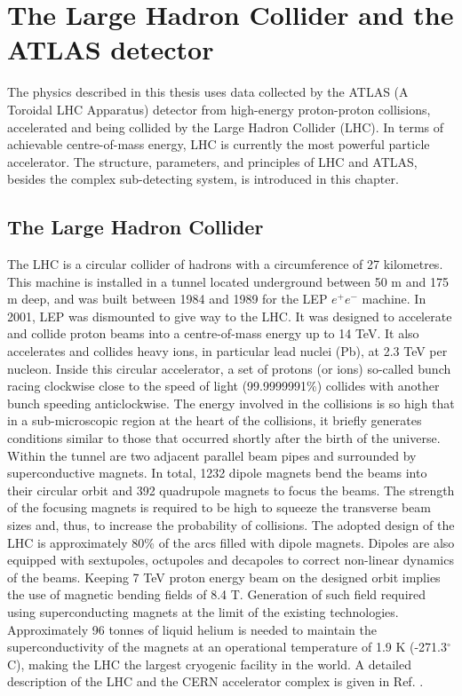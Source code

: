 \chapter{The Large Hadron Collider and the ATLAS detector}
\label{LHC&ATLAS}

The physics described in this thesis uses data collected by the ATLAS (A Toroidal LHC Apparatus) detector from high-energy proton-proton collisions, accelerated and being collided by the Large Hadron Collider (LHC). In terms of achievable centre-of-mass energy, LHC is currently the most powerful particle accelerator. The structure, parameters, and principles of LHC and ATLAS, besides the complex sub-detecting system, is introduced in this chapter.

\section{The Large Hadron Collider}
\label{chap2:LHC}
The LHC is a circular collider of hadrons with a circumference of 27 kilometres. This machine is installed in a tunnel located underground between 50 m and 175 m deep, and was built between 1984 and 1989 for the LEP $e^+e^-$ machine. In 2001, LEP was dismounted to give way to the LHC. It was designed to accelerate and collide proton beams into a centre-of-mass energy up to 14 TeV. It also accelerates and collides heavy ions, in particular lead nuclei (Pb), at 2.3 TeV per nucleon. Inside this circular accelerator, a set of protons (or ions) so-called bunch racing clockwise close to the speed of light (99.9999991\%) collides with another bunch speeding anticlockwise. The energy involved in the collisions is so high that in a sub-microscopic region at the heart of the collisions, it briefly generates conditions similar to those that occurred shortly after the birth of the universe. \\ 
Within the tunnel are two adjacent parallel beam pipes and surrounded by superconductive magnets. In total, 1232 dipole magnets bend the beams into their circular orbit and 392 quadrupole magnets to focus the beams. The strength of the focusing magnets is required to be high to squeeze the transverse beam sizes and, thus, to increase the probability of collisions. The adopted design of the LHC is approximately 80\% of the arcs filled with dipole magnets. Dipoles are also equipped with sextupoles, octupoles and decapoles to correct non-linear dynamics of the beams.  Keeping 7 TeV proton energy beam on the designed orbit implies the use of magnetic bending fields of 8.4 T. Generation of such field required using superconducting magnets at the limit of the existing technologies. Approximately 96 tonnes of liquid helium is needed to maintain the superconductivity of the magnets at an operational temperature of 1.9 K (-271.3$^{\circ}$C), making the LHC the largest cryogenic facility in the world.  A detailed description of the LHC and the CERN accelerator complex is given in Ref. \cite{LHCTDR}.

